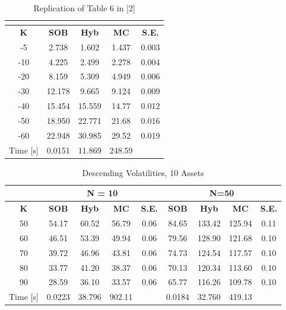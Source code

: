 \documentclass[a4paper]{article}
\begin{document}
\begin {table}
\caption {Replication of Table 6 in [2]} 
\begin{center}
\begin{tabular}{c|c c c c}
\hline
\multicolumn{1}{c|}{} & \multicolumn{4}{|c}{} \\ 
\hline
  \textbf{K} & \textbf{SOB} & \textbf{Hyb} & \textbf{MC} & \textbf{S.E.}\\
  -5 & 2.738	& 1.602	& 1.437    &  0.003\\
-10 & 4.225	& 2.499	& 2.278    &	0.004\\
-20 & 8.159	& 5.309	& 4.949    & 0.006\\
-30 & 12.178	& 9.665	& 9.124& 0.009\\
-40 & 15.454	& 15.559	& 14.77 & 0.012\\
-50 & 18.950	& 22.771	& 21.68 & 0.016\\
-60 & 22.948	& 30.985	& 29.52 & 0.019\\
\hline
Time [s] & 0.0151 & 11.869 & 248.59 & \\
\hline
\end{tabular}
\end{center}
\end{table}

\begin {table}
\caption {Descending Volatilities, 10 Assets} 
\begin{center}
\begin{tabular}{c|c c c c|c c c c}
\hline
\multicolumn{1}{c|}{} & \multicolumn{4}{|c|}{N = 10} & \multicolumn{4}{|c}{N=50} \\ 
\hline
  \textbf{K} & \textbf{SOB} & \textbf{Hyb} & \textbf{MC} & \textbf{S.E.} & \textbf{SOB} & \textbf{Hyb} & \textbf{MC} & \textbf{S.E.}\\
50 &	54.17& 60.52 	& 56.79 & 0.06 & 84.65 & 133.42 & 125.94 & 0.11 \\
60 & 46.51	& 53.39 	& 49.94 & 0.06   & 79.56  & 128.90 & 121.68 & 0.10  \\
70 & 39.72	& 46.96	& 43.81 & 0.06  & 74.73 & 124.54 & 117.57 & 0.10\\
80 & 33.77	& 41.20 	& 38.37 & 0.06  & 70.13  & 120.34 & 113.60 & 0.10  \\
90 & 28.59& 36.10	& 33.57  & 0.06  & 65.77 & 116.26 & 109.78 &0.10\\
\hline
Time [s] & 0.0223 & 38.796 & 902.11 & & 0.0184 & 32.760 & 419.13 \\
\hline
\end{tabular}
\end{center}
\end{table}
\end{document}

